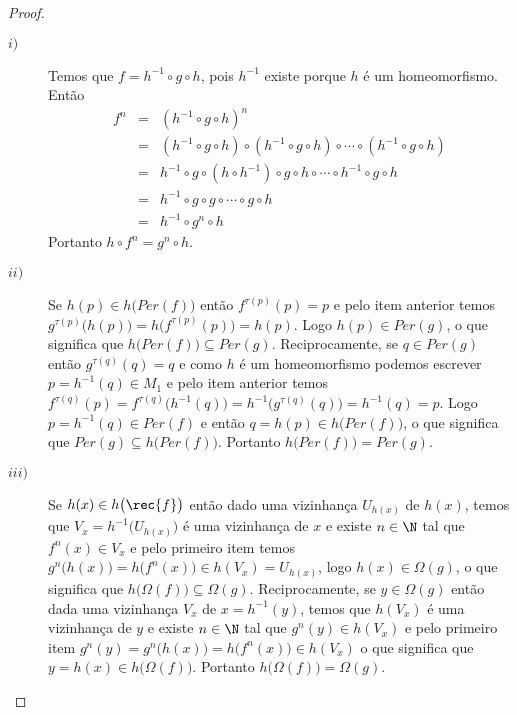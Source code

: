 \begin{proof}
\begin{description}
\item[$i)$] Temos que $f=h^{-1}\circ g\circ h$, pois $h^{-1}$ existe porque $h$ é um homeomorfismo. Então \vspace{-0.5cm}\begin{eqnarray*}
f^n & = & (h^{-1}\circ g\circ h)^n\\
 & = &(h^{-1}\circ g\circ h)\circ(h^{-1}\circ g\circ h)\circ\cdots\circ(h^{-1}\circ g\circ h)\\
 & = & h^{-1}\circ g\circ (h\circ h^{-1})\circ g\circ h\circ\cdots\circ h^{-1}\circ g\circ h\\
 & = & h^{-1}\circ g\circ g\circ\cdots\circ g\circ h\\
 & = & h^{-1}\circ g^n\circ h
\end{eqnarray*}
Portanto $h\circ f^n= g^n\circ h$.

\item[$ii)$] Se $h(p)\in h\big(Per(f)\big)$ então $f^{\tau(p)}(p)=p$ e pelo item anterior temos $g^{\tau(p)}\big(h(p)\big)=h\big(f^{\tau(p)}(p)\big)=h(p)$. Logo $h(p)\in Per(g)$, o que significa que $h\big(Per(f)\big)\subseteq Per(g)$. Reciprocamente, se $q\in Per(g)$ então $g^{\tau(q)}(q)=q$ e como $h$ é um homeomorfismo podemos escrever $p=h^{-1}(q)\in M_1$ e pelo item anterior temos $f^{\tau(q)}(p)=f^{\tau(q)}\big(h^{-1}(q)\big)=h^{-1}\big(g^{\tau(q)}(q)\big)=h^{-1}(q)=p$. Logo $p=h^{-1}(q)\in Per(f)$ e então $q=h(p)\in h\big(Per(f)\big)$, o que significa que $Per(g)\subseteq h\big(Per(f)\big)$. Portanto $h\big(Per(f)\big)=Per(g)$.

\item[$iii)$] Se $h(x)\in h\big(\rec{f}\big)$ então dado uma vizinhança $U_{h(x)}$ de $h(x)$, temos que $V_x=h^{-1}\big(U_{h(x)}\big)$ é uma vizinhança de $x$ e existe $n\in\N$ tal que $f^n(x)\in V_x$ e pelo primeiro item temos $g^n\big(h(x)\big)=h\big(f^n(x)\big)\in h(V_x)=U_{h(x)}$, logo $h(x)\in \Omega(g)$, o que significa que $h\big(\Omega(f)\big)\subseteq\Omega(g)$. Reciprocamente, se $y\in\Omega(g)$  então dada uma vizinhança $V_x$ de $x=h^{-1}(y)$, temos que $h(V_x)$ é uma vizinhança de $y$ e existe $n\in\N$ tal que $g^n(y)\in h(V_x)$ e pelo primeiro item $g^n(y)=g^n\big(h(x)\big)=h\big(f^n(x)\big)\in h(V_x)$ o que significa que $y=h(x)\in h\big(\Omega(f)\big)$. Portanto $h\big(\Omega(f)\big)=\Omega(g)$.



\end{description}
\end{proof}
